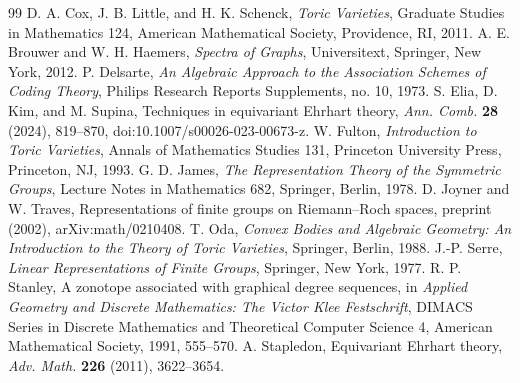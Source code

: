 \documentclass[12pt,letterpaper]{article}
\theoremstyle{definition}
\theoremstyle{remark}
\numberwithin{equation}{section}
\begin{document}
\begin{thebibliography}{99}
 D. A. Cox, J. B. Little, and H. K. Schenck, \emph{Toric Varieties}, Graduate Studies in Mathematics 124, American Mathematical Society, Providence, RI, 2011.
 A. E. Brouwer and W. H. Haemers, \emph{Spectra of Graphs}, Universitext, Springer, New York, 2012.
 P. Delsarte, \emph{An Algebraic Approach to the Association Schemes of Coding Theory}, Philips Research Reports Supplements, no. 10, 1973.
 S. Elia, D. Kim, and M. Supina, Techniques in equivariant Ehrhart theory, \emph{Ann. Comb.} \textbf{28} (2024), 819--870, doi:10.1007/s00026-023-00673-z.
 W. Fulton, \emph{Introduction to Toric Varieties}, Annals of Mathematics Studies 131, Princeton University Press, Princeton, NJ, 1993.
 G. D. James, \emph{The Representation Theory of the Symmetric Groups}, Lecture Notes in Mathematics 682, Springer, Berlin, 1978.
 D. Joyner and W. Traves, Representations of finite groups on Riemann--Roch spaces, preprint (2002), arXiv:math/0210408.
 T. Oda, \emph{Convex Bodies and Algebraic Geometry: An Introduction to the Theory of Toric Varieties}, Springer, Berlin, 1988.
 J.-P. Serre, \emph{Linear Representations of Finite Groups}, Springer, New York, 1977.
 R. P. Stanley, A zonotope associated with graphical degree sequences, in \emph{Applied Geometry and Discrete Mathematics: The Victor Klee Festschrift}, DIMACS Series in Discrete Mathematics and Theoretical Computer Science 4, American Mathematical Society, 1991, 555--570.
 A. Stapledon, Equivariant Ehrhart theory, \emph{Adv. Math.} \textbf{226} (2011), 3622--3654.
\end{thebibliography}
\end{document}
